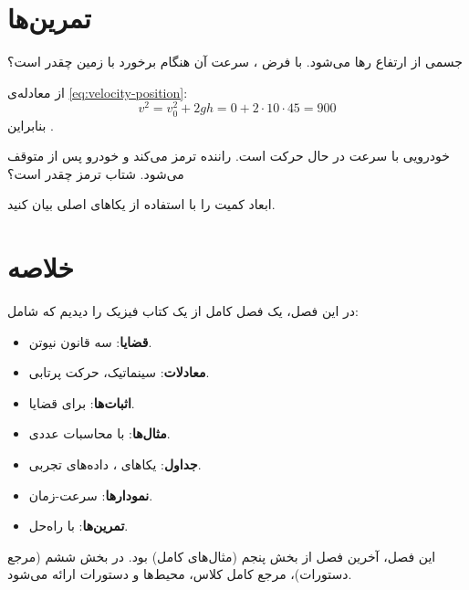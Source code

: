 \section{تمرین‌ها}
\label{sec:physics-book-exercises}

\begin{exercise}
    جسمی از ارتفاع 
    رها می‌شود. با فرض ،
    سرعت آن هنگام برخورد با زمین چقدر
    است؟
    \label{exc:free-fall}
\end{exercise}

\begin{solution}
    از معادله‌ی \cref{eq:velocity-position}:
    \[
        v^2 = v_0^2 + 2g h = 0 + 2 \cdot 10 \cdot 45 = 900
    \]
    بنابراین .
\end{solution}

\begin{exercise}
    خودرویی با سرعت 
    در حال حرکت است. راننده ترمز می‌کند و
    خودرو پس از  متوقف
    می‌شود. شتاب ترمز چقدر است؟
    \label{exc:braking-distance}
\end{exercise}

\begin{exercise}
    ابعاد کمیت  را با استفاده
    از یکاهای اصلی  بیان کنید.
    \label{exc:force-dimension}
\end{exercise}

\section{خلاصه}
\label{sec:physics-book-summary}

در این فصل، یک فصل کامل از یک کتاب
فیزیک را دیدیم که شامل:

\begin{itemize}
    \item \textbf{قضایا}: سه قانون نیوتن.
    \item \textbf{معادلات}: سینماتیک،
    حرکت پرتابی.
    \item \textbf{اثبات‌ها}: برای قضایا.
    \item \textbf{مثال‌ها}: با محاسبات عددی.
    \item \textbf{جداول}: یکاهای ،
    داده‌های تجربی.
    \item \textbf{نمودارها}: سرعت-زمان.
    \item \textbf{تمرین‌ها}: با راه‌حل.
\end{itemize}


این فصل، آخرین فصل از بخش پنجم (مثال‌های
کامل) بود. در بخش ششم (مرجع دستورات)،
مرجع کامل کلاس، محیط‌ها و دستورات ارائه
می‌شود.